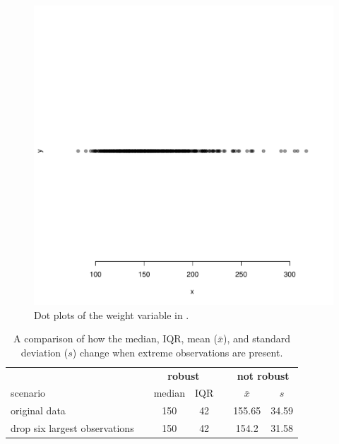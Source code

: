 \begin{doublespace}
\begin{figure}[ht]
	\centering
	\includegraphics[width=\textwidth]{ch_intro_to_data_oi_biostat/figures/famussWeightDotPlotRobustEx/famussWeightDotPlotRobustEx}
	\caption{Dot plots of the weight variable in .}
	\label{famussWeightDotPlotRobustEx}
\end{figure}

\begin{table}[ht]
	\centering
	\begin{tabular}{l c cc c cc}
		\hline
		& \hspace{0mm} & \multicolumn{2}{c}{\bf robust} & \hspace{2mm} & \multicolumn{2}{c}{\bf not robust} \\
		scenario && median & IQR && $\bar{x}$ & $s$ \\ 
		\hline
		original \var{weight} data 	&& 150 & 42 && 155.65 & 34.59 \\
		drop six largest observations && 150 & 42 && 154.2 & 31.58 \\
		
		\hline
	\end{tabular}
	\caption{A comparison of how the median, IQR, mean ($\bar{x}$), and standard deviation ($s$) change when extreme observations are present.}
	\label{robustOrNotTable}
\end{table}




\end{doublespace}
